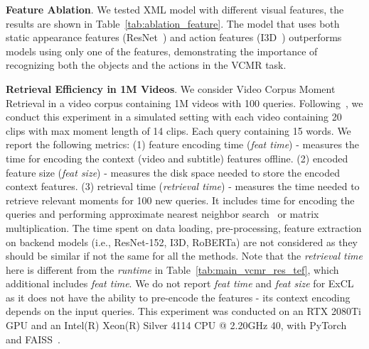 \documentclass[runningheads]{llncs}
\newcommand{\ra}[1]{\renewcommand{\arraystretch}{#1}}
\begin{document}
\begin{table}[!t]
\setlength{\tabcolsep}{0.3em}
\ra{1.}
\centering
\small
\caption{Feature ablation on TVR \textit{val} set, VCMR task. All  models use both videos and subtitles}
\label{tab:ablation_feature}
\end{table}


\kern2mm
\noindent\textbf{Feature Ablation}. We tested XML model with different visual features, the results are shown in Table~\ref{tab:ablation_feature}. 
The model that uses both static appearance features (ResNet~\cite{he2016deep}) and action features (I3D~\cite{carreira2017quo}) outperforms models using only one of the features, demonstrating the importance of recognizing both the objects and the actions in the VCMR task. 


\kern2mm
\noindent\textbf{Retrieval Efficiency in 1M Videos}. We consider Video Corpus Moment Retrieval in a video corpus containing 1M videos with 100 queries. Following~\cite{escorcia2019temporal}, we conduct this experiment in a simulated setting with each video containing 20 clips with max moment length of 14 clips. Each query containing 15 words. We report the following metrics: (1) feature encoding time (\textit{feat time}) - measures the time for encoding the context (video and subtitle) features offline. (2) encoded feature size (\textit{feat size}) - measures the disk space needed to store the encoded context features. (3) retrieval time (\textit{retrieval time}) - measures the time needed to retrieve relevant moments for 100 new queries. It includes time for encoding the queries and performing approximate nearest neighbor search~\cite{JDH17} or matrix multiplication. The time spent on data loading, pre-processing, feature extraction on backend models (i.e., ResNet-152, I3D, RoBERTa) are not considered as they should be similar if not the same for all the methods. Note that the \textit{retrieval time} here is different from the \textit{runtime} in Table~\ref{tab:main_vcmr_res_tef}, which additional includes \textit{feat time}. We do not report \textit{feat time} and \textit{feat size} for ExCL~\cite{ghosh2019excl} as it does not have the ability to pre-encode the features - its context encoding depends on the input queries. This experiment was conducted on an RTX 2080Ti GPU and an Intel(R) Xeon(R) Silver 4114 CPU @ 2.20GHz  40, with PyTorch~\cite{paszke2017automatic} and FAISS~\cite{JDH17}.
\end{document}
